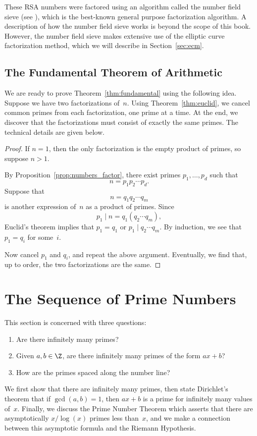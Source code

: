 These RSA numbers were factored using an algorithm called the number
field sieve (see \cite{lenstras:nfs}), which is the best-known general
purpose factorization algorithm.  A description of how the number
field sieve works is beyond the scope of this book.  However, the
number field sieve makes extensive use of the elliptic curve
factorization method, which we will describe in Section~\ref{sec:ecm}.

\subsection{The Fundamental Theorem of Arithmetic}%
\label{sec:proof_fundamental}
We are ready to prove Theorem~\ref{thm:fundamental}
using the following idea.
Suppose we have two factorizations of~$n$. Using
Theorem~\ref{thm:euclid}, we cancel common primes from each factorization,
one prime at a time.  At the end,
we discover that the factorizations must
consist of exactly the same primes.  The
technical details are given below.
\begin{proof}
  If $n=1$, then the only factorization is the empty
  product of primes, so suppose $n>1$.

  By Proposition~\ref{prop:numbers_factor}, there exist primes
  $p_1,\ldots, p_d$ such that
$$
  n = p_1 p_2 \cdots p_d.
$$
Suppose that
$$n = q_1 q_2 \cdots q_m$$
is another expression of~$n$ as a product of primes.
Since
$$p_1 \mid n = q_1 (q_2 \cdots q_m),$$
Euclid's theorem implies that $p_1 = q_1$ or
$p_1 \mid q_2\cdots q_m$.  By induction, we see that $p_1 = q_i$ for some~$i$.

Now cancel $p_1$ and $q_i$, and repeat the above argument.  Eventually,
we find that, up to order, the two factorizations are the same.
\end{proof}



\section{The Sequence of Prime Numbers}
\label{sec:primeseq}
This section is concerned with three questions:
\begin{enumerate}
\item Are there infinitely many primes?
\item Given $a,b\in\Z$,
are there infinitely many primes of the form $ax+b$?
\item How are the primes spaced along the number line?
\end{enumerate}
We first show that there are infinitely
many primes, then state Dirichlet's theorem
 that if $\gcd(a,b)=1$,
then $ax+b$ is a prime for infinitely many values of~$x$. Finally, we
discuss the Prime Number Theorem
which asserts that there are
asymptotically $x/\log(x)$ primes less than~$x$,
and we make a connection between this asymptotic formula
and the Riemann Hypothesis.

